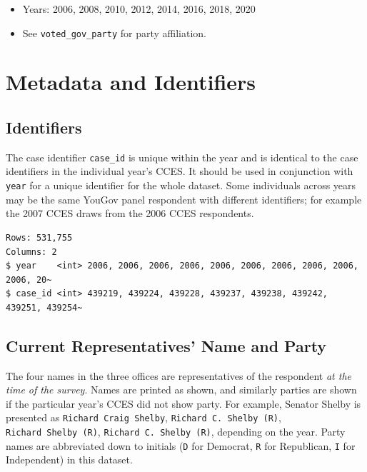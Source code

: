 \documentclass[10pt,article,oneside]{memoir}
\theoremstyle{definition}
\begin{document}
\begin{itemize}
\tightlist
\item
  Years: 2006, 2008, 2010, 2012, 2014, 2016, 2018, 2020
\item
  See \texttt{voted\_gov\_party} for party affiliation.
\end{itemize}

\newpage

\hypertarget{metadata-and-identifiers}{%
\section{Metadata and Identifiers}\label{metadata-and-identifiers}}

\hypertarget{identifiers}{%
\subsection{Identifiers}\label{identifiers}}

The case identifier \texttt{case\_id} is unique within the year and is
identical to the case identifiers in the individual year's CCES. It
should be used in conjunction with \texttt{year} for a unique identifier
for the whole dataset. Some individuals across years may be the same
YouGov panel respondent with different identifiers; for example the 2007
CCES draws from the 2006 CCES respondents.

\begin{verbatim}
Rows: 531,755
Columns: 2
$ year    <int> 2006, 2006, 2006, 2006, 2006, 2006, 2006, 2006, 2006, 2006, 20~
$ case_id <int> 439219, 439224, 439228, 439237, 439238, 439242, 439251, 439254~
\end{verbatim}

\hypertarget{current-representatives-name-and-party}{%
\subsection{Current Representatives' Name and
Party}\label{current-representatives-name-and-party}}

The four names in the three offices are representatives of the
respondent \emph{at the time of the survey}. Names are printed as shown,
and similarly parties are shown if the particular year's CCES did not
show party. For example, Senator Shelby is presented as
\texttt{Richard\ Craig\ Shelby}, \texttt{Richard\ C.\ Shelby\ (R)},
\texttt{Richard\ Shelby\ (R)}, \texttt{Richard\ C.\ Shelby\ (R)},
depending on the year. Party names are abbreviated down to initials
(\texttt{D} for Democrat, \texttt{R} for Republican, \texttt{I} for
Independent) in this dataset.
\end{document}
